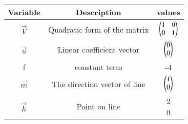 \begin{tabular}[12pt]{ |c| c| c |}
    \hline
    \textbf{Variable} & \textbf{Description} & \textbf{values}\\ 
    \hline
    $\vec{V}$ & Quadratic form of the matrix & $\begin{pmatrix}1 & 0 \\ 0 & 1\end{pmatrix} $\\
    \hline
    $\vec{u}$ & Linear coefficient vector & $\begin{pmatrix}0 \\ 0\end{pmatrix} $\\
    \hline
    f & constant term & -4 \\ 
    \hline
    $\vec{m}$ & The direction vector of line & $\begin{pmatrix}1 \\ 0\end{pmatrix}$\\
    \hline
     $\vec{h}$ & Point on line & \myvec{2 \\ 0} \\
     \hline
\end{tabular}
